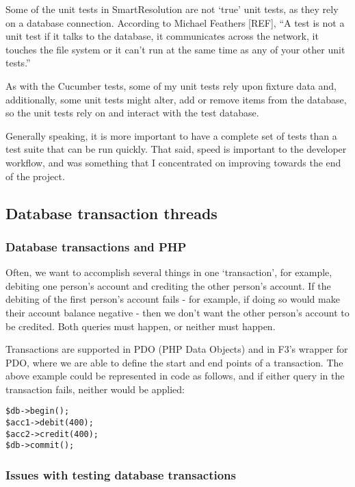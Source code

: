 Some of the unit tests in SmartResolution are not `true' unit tests, as they rely on a database connection. According to Michael Feathers [REF], ``A test is not a unit test if it talks to the database, it communicates across the network, it touches the file system or it can't run at the same time as any of your other unit tests.'' %

As with the Cucumber tests, some of my unit tests rely upon fixture data and, additionally, some unit tests might alter, add or remove items from the database, so the unit tests rely on and interact with the test database.

Generally speaking, it is more important to have a complete set of tests than a test suite that can be run quickly. That said, speed is important to the developer workflow, and was something that I concentrated on improving towards the end of the project.

\subsection{Database transaction threads}

\subsubsection{Database transactions and PHP}

Often, we want to accomplish several things in one `transaction', for example, debiting one person's account and crediting the other person's account. If the debiting of the first person's account fails - for example, if doing so would make their account balance negative - then we don't want the other person's account to be credited. Both queries must happen, or neither must happen.

Transactions are supported in PDO (PHP Data Objects) and in F3's wrapper for PDO, where we are able to define the start and end points of a transaction. The above example could be represented in code as follows, and if either query in the transaction fails, neither would be applied:

\begin{lstlisting}
$db->begin();
$acc1->debit(400);
$acc2->credit(400);
$db->commit();
\end{lstlisting}

\subsubsection{Issues with testing database transactions}

